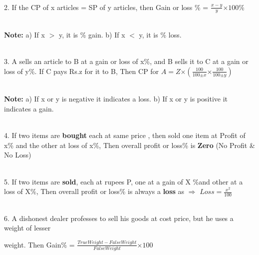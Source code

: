 \documentclass{article}
\begin{document}
\noindent \\  2.   If the CP of x articles = SP of y articles, then 
Gain or loss \% = $ \frac{x-y}{y} \mathrm{\times} 100\% $

\noindent 

\noindent \\ \textbf{Note:}
a) If x $\mathrm{>}$ y, it is \% gain.
b) If x $\mathrm{<}$ y, it is \% loss.

\noindent 

\noindent 

\noindent 

\noindent \\ 3.   A sells an article to B at a gain or loss of x\%, and B sells it to C at a gain or loss of y\%. If C pays Rs.z for it to B, Then  CP  for $ A = Z \mathrm{\times} (\frac{100}{100 \mathrm{\pm} x} \mathrm{\times} \frac{100}{100 \mathrm{\pm} y} )$



\noindent \\ \textbf{Note: }
a) If x or y is negative it indicates a loss.
b)  If x or y is positive it indicates a gain.

\noindent 

\noindent 

\noindent 

\noindent \\ 4.   If two items are \textbf{bought }each at same price , then sold one item at Profit of x\% and the other at loss of x\%, Then overall profit or loss\%  is \textbf{Zero }(No Profit \& No Loss)

\noindent 

\noindent 

\noindent 

\noindent 

\noindent \\ 5.   If two items are \textbf{sold}, each at rupees P, one at a gain of X \%and other at a loss of X\%, Then overall profit or loss\% is always a \textbf{loss }as $\mathrm{\Rightarrow }$ $ Loss = \frac{x^{2}}{100} $

\noindent 

\noindent 

\noindent 

\noindent \\ 6.   A dishonest dealer professes to sell his goods at cost price, but he uses a weight of lesser

\noindent weight. Then Gain\% = $ \frac{True Weight - False Weight}{False Weight} \mathrm{\times} 100 $
\end{document}
